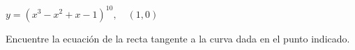 \setcounter{enumi}{52}
\item $y = (x^3 - x^2 + x - 1)^{10}, \quad (1, 0)$
\par
Encuentre la ecuación de la recta tangente a la curva dada en el punto indicado.
